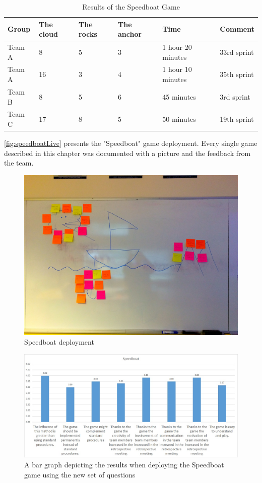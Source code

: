 \begin{table}[!htbp]
	\caption{Results of the Speedboat Game}
	\label{tab:groups-speedTeamResultsN}
	\begin{tabularx}{\textwidth}{|X|X|X|X|X|X|}
	\hline
		Group &  The cloud & The rocks & The anchor & Time & Comment\\ \hline
		Team A & 8 & 5 & 3 & 1 hour 20 minutes & 33rd sprint \\ \hline
		Team A & 16 & 3 & 4 & 1 hour 10 minutes & 35th sprint\\ \hline
		Team B & 8 & 5 & 6 & 45 minutes & 3rd sprint\\ \hline
        Team C & 17 & 8 & 5 & 50 minutes & 19th sprint\\ \hline
	\end{tabularx}
\end{table}

\autoref{fig:speedboatLive} presents the "Speedboat" game deployment. Every single game described in this chapter was documented with a picture and the feedback from the team.

\begin{figure}[!htbp]
\caption{Speedboat deployment}
\label{fig:speedboatLive}
\centering
\includegraphics[width=1\textwidth]{live/speedboatLive}
\end{figure}

\begin{figure}[!htbp]
\caption{A bar graph depicting the results when deploying the Speedboat game using the new set of questions}
\label{fig:speedboatResultsNew}
\centering
\includegraphics[width=1\textwidth]{charts/speedboatNewSet}
\end{figure}

